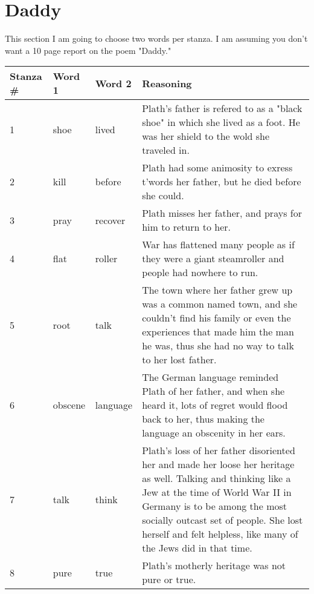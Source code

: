 \documentclass[a4paper,12pt]{article}
\begin{document}
\section*{Daddy}
This section I am going to choose two words per stanza.  I am assuming you don't want a 10 page report on the poem "Daddy."
\begin{center}
	\begin{tabular}{|l|l|l|p{2.5in}|}
	\hline
	Stanza \#& Word 1 & Word 2 & Reasoning \\ \hline
	1&shoe&lived&Plath's father is refered to as a "black shoe" in which she lived as a foot.  He was her shield to the wold she traveled in.\\ \hline
	2&kill&before&Plath had some animosity to exress t'words her father, but he died before she could.\\ \hline
	3&pray&recover&Plath misses her father, and prays for him to return to her.\\ \hline
	4&flat&roller&War has flattened many people as if they were a giant steamroller and people had nowhere to run.\\ \hline
	5&root&talk&The town where her father grew up was a common named town, and she couldn't find his family or even the experiences that made him the man he was, thus she had no way to talk to her lost father.\\ \hline
	6&obscene&language&The German language reminded Plath of her father, and when she heard it, lots of regret would flood back to her, thus making the language an obscenity in her ears.\\ \hline
	7&talk&think&Plath's loss of her father disoriented her and made her loose her heritage as well.  Talking and thinking like a Jew at the time of World War II in Germany is to be among the most socially outcast set of people.  She lost herself and felt helpless, like many of the Jews did in that time.\\ \hline
	8&pure&true&Plath's motherly heritage was not pure or true.\\ \hline
	\end{tabular}
\end{center}
\end{document}

